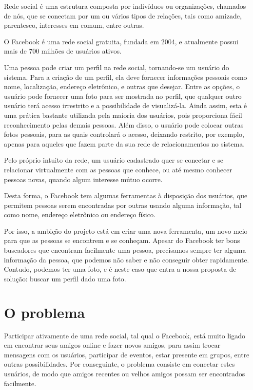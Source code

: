 \documentclass[10pt,a4paper]{article}
\begin{document}
	Rede social é uma estrutura composta por indivíduos ou organizações, chamados de nós, que se conectam por um ou vários tipos de relações, tais como amizade, parentesco, interesses em comum, entre outras.
	
	O Facebook é uma rede social gratuita, fundada em 2004, e atualmente possui mais de 700 milhões de usuários ativos.

	Uma pessoa pode criar um perfil na rede social, tornando-se um
        usuário do sistema. Para a criação de um perfil, ela deve
        fornecer informações pessoais como nome, localização, endereço
        eletrônico, e outras que desejar. Entre as opções, o usuário
        pode fornecer uma foto para ser mostrada no perfil, que
        qualquer outro usuário terá acesso irrestrito e a
        possibilidade de visualizá-la. Ainda assim, esta é uma prática
        bastante utilizada pela maioria dos usuários, pois proporciona
        fácil reconhecimento pelas demais pessoas. Além disso, o
        usuário pode colocar outras fotos pessoais, para as quais
        controlará o acesso, deixando restrito, por exemplo, apenas para aqueles que fazem parte da sua rede de relacionamentos no sistema.

	Pelo próprio intuito da rede, um usuário cadastrado quer se conectar e se relacionar virtualmente com as pessoas que conhece, ou até mesmo conhecer pessoas novas, quando algum interesse mútuo ocorre.

	Desta forma, o Facebook tem algumas ferramentas à disposição dos usuários, que permitem pessoas serem encontradas por outras usando alguma informação, tal como nome, endereço eletrônico ou endereço físico.

	Por isso, a ambição do projeto está em criar uma nova
        ferramenta, um novo meio para que as pessoas se encontrem e se
        conheçam. Apesar do Facebook ter bons buscadores que encontram
        facilmente uma pessoa, precisamos sempre ter alguma informação
        da pessoa, que podemos não saber e não conseguir obter
        rapidamente. Contudo, podemos ter uma foto, e é neste caso que
        entra a nossa proposta de solução: buscar um perfil dado uma
        foto.
\newpage
  \section{O problema}

	Participar ativamente de uma rede social, tal qual o Facebook, está muito ligado em encontrar seus amigos online e fazer novos amigos, para assim trocar mensagens com os usuários, participar de eventos, estar presente em grupos, entre outras possibilidades. Por conseguinte, o problema consiste em conectar estes usuários, de modo que amigos recentes ou velhos amigos possam ser encontrados facilmente.
\end{document}
